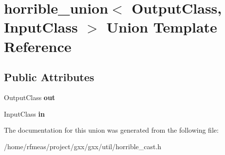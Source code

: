 \hypertarget{unionhorrible__union}{}\section{horrible\+\_\+union$<$ Output\+Class, Input\+Class $>$ Union Template Reference}
\label{unionhorrible__union}
\subsection*{Public Attributes}
\begin{DoxyCompactItemize}
\item 
Output\+Class {\bfseries out}\hypertarget{unionhorrible__union_a5ee949a15257ca19056bf11f9dfa7fcc}{}\label{unionhorrible__union_a5ee949a15257ca19056bf11f9dfa7fcc}

\item 
Input\+Class {\bfseries in}\hypertarget{unionhorrible__union_a45620e2dd9b8ab97627b8df9def30a24}{}\label{unionhorrible__union_a45620e2dd9b8ab97627b8df9def30a24}

\end{DoxyCompactItemize}


The documentation for this union was generated from the following file\+:\begin{DoxyCompactItemize}
\item 
/home/rfmeas/project/gxx/gxx/util/horrible\+\_\+cast.\+h\end{DoxyCompactItemize}

